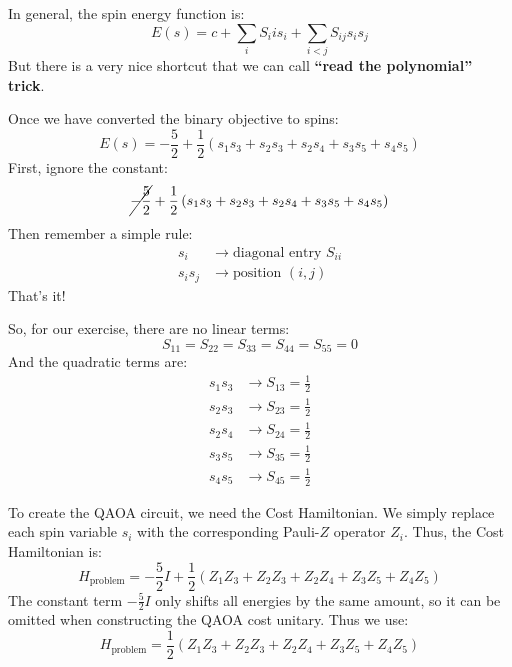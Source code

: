 \highspace
\begin{deepeningbox}
    In general, the spin energy function is:
    \begin{equation*}
        E(s) = c + \sum_{i} S_ii s_i + \sum_{i<j} S_{ij} s_i s_j
    \end{equation*}
    But there is a very nice shortcut that we can call \textbf{``read the polynomial'' trick}.

    \highspace
    Once we have converted the binary objective to spins:
    \begin{equation*}
        E(s) = -\frac{5}{2} + \frac{1}{2}\left(s_1s_3 + s_2s_3 + s_2s_4 + s_3s_5 + s_4s_5\right)
    \end{equation*}
    First, ignore the constant:
    \begin{equation*}
        \cancel{-\frac{5}{2}} + \frac{1}{2}\left(s_1s_3 + s_2s_3 + s_2s_4 + s_3s_5 + s_4s_5\right)
    \end{equation*}
    Then remember a simple rule:
    \begin{align*}
        s_i & \to \text{diagonal entry } S_{ii} \\
        s_i s_j & \to \text{position } (i,j)
    \end{align*}
    That's it!

    \highspace
    So, for our exercise, there are no linear terms:
    \begin{equation*}
        S_{11} = S_{22} = S_{33} = S_{44} = S_{55} = 0
    \end{equation*}
    And the quadratic terms are:
    \begin{align*}
        s_1 s_3 & \to S_{13} = \frac{1}{2} \\[.3em]
        s_2 s_3 & \to S_{23} = \frac{1}{2} \\[.3em]
        s_2 s_4 & \to S_{24} = \frac{1}{2} \\[.3em]
        s_3 s_5 & \to S_{35} = \frac{1}{2} \\[.3em]
        s_4 s_5 & \to S_{45} = \frac{1}{2}
    \end{align*}
\end{deepeningbox}

\highspace
{} To create the QAOA circuit, we need the Cost Hamiltonian. We simply replace each spin variable $s_i$ with the corresponding Pauli-$Z$ operator $Z_i$. Thus, the Cost Hamiltonian is:
\begin{equation*}
    H_{\text{problem}} = -\frac{5}{2}I + \frac{1}{2}\left(Z_1Z_3 + Z_2Z_3 + Z_2Z_4 + Z_3Z_5 + Z_4Z_5\right)
\end{equation*}
The constant term $-\frac{5}{2}I$ only shifts all energies by the same amount, so it can be omitted when constructing the QAOA cost unitary. Thus we use:
\begin{equation*}
    \boxed{H_{\text{problem}} = \frac{1}{2}\left(Z_1Z_3 + Z_2Z_3 + Z_2Z_4 + Z_3Z_5 + Z_4Z_5\right)}
\end{equation*}

